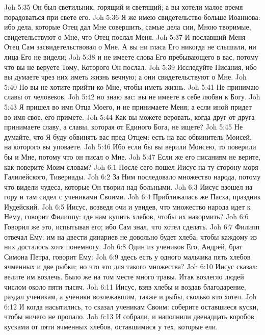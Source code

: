 \vs Joh 5:35 Он был светильник, горящий и светящий; а вы хотели малое время порадоваться при свете его.
\vs Joh 5:36 Я же имею свидетельство больше Иоаннова: ибо дела, которые Отец дал Мне совершить, самые дела сии, Мною творимые, свидетельствуют о Мне, что Отец послал Меня.
\vs Joh 5:37 И пославший Меня Отец Сам засвидетельствовал о Мне. А вы ни гласа Его никогда не слышали, ни лица Его не видели;
\vs Joh 5:38 и не имеете слова Его пребывающего в вас, потому что вы не веруете Тому, Которого Он послал.
\vs Joh 5:39 Исследуйте Писания, ибо вы думаете чрез них иметь жизнь вечную; а они свидетельствуют о Мне.
\vs Joh 5:40 Но вы не хотите прийти ко Мне, чтобы иметь жизнь.
\vs Joh 5:41 Не принимаю славы от человеков,
\vs Joh 5:42 но знаю вас: вы не имеете в себе любви к Богу.
\vs Joh 5:43 Я пришел во имя Отца Моего, и не принимаете Меня; а если иной придет во имя свое, его примете.
\vs Joh 5:44 Как вы можете веровать, когда друг от друга принимаете славу, а славы, которая от Единого Бога, не ищете?
\vs Joh 5:45 Не думайте, что Я буду обвинять вас пред Отцем: есть на вас обвинитель Моисей, на которого вы уповаете.
\vs Joh 5:46 Ибо если бы вы верили Моисею, то поверили бы и Мне, потому что он писал о Мне.
\vs Joh 5:47 Если же его писаниям не верите, как поверите Моим словам?
\vs Joh 6:1 После сего пошел Иисус на ту сторону моря Галилейского,  Тивериады.
\vs Joh 6:2 За Ним последовало множество народа, потому что видели чудеса, которые Он творил над больными.
\vs Joh 6:3 Иисус взошел на гору и там сидел с учениками Своими.
\vs Joh 6:4 Приближалась же Пасха, праздник Иудейский.
\vs Joh 6:5 Иисус, возведя очи и увидев, что множество народа идет к Нему, говорит Филиппу: где нам купить хлебов, чтобы их накормить?
\vs Joh 6:6 Говорил же это, испытывая его; ибо Сам знал, что хотел сделать.
\vs Joh 6:7 Филипп отвечал Ему: им на двести динариев не довольно будет хлеба, чтобы каждому из них досталось хотя понемногу.
\vs Joh 6:8 Один из учеников Его, Андрей, брат Симона Петра, говорит Ему:
\vs Joh 6:9 здесь есть у одного мальчика пять хлебов ячменных и две рыбки; но что это для такого множества?
\vs Joh 6:10 Иисус сказал: велите им возлечь. Было же на том месте много травы. Итак возлегло людей числом около пяти тысяч.
\vs Joh 6:11 Иисус, взяв хлебы и воздав благодарение, раздал ученикам, а ученики возлежавшим, также и рыбы, сколько кто хотел.
\vs Joh 6:12 И когда насытились, то сказал ученикам Своим: соберите оставшиеся куски, чтобы ничего не пропало.
\vs Joh 6:13 И собрали, и наполнили двенадцать коробов кусками от пяти ячменных хлебов, оставшимися у тех, которые ели.
